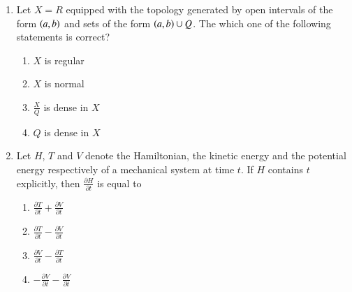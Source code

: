 \documentclass[journal]{IEEEtran}
\begin{document}
\begin{enumerate}
\item Let $X = R$ equipped with the topology generated by open intervals of the form $\left(
		a,b\right)$ and sets of the form $\left(a,b\right) \cup Q$. The which one of the following statements is correct?
\begin{multicols}{2}
    \begin{enumerate}
        \item $X$ is regular
        \item $X$ is normal
        \item $\frac{X}{Q}$ is dense in $X$
        \item $Q$ is dense in $X$
    \end{enumerate}
\end{multicols}

\item Let $H$, $T$ and $V$ denote the Hamiltonian, the kinetic energy and the potential energy respectively of a mechanical system at time $t$. If $H$ contains $t$ explicitly, then $\frac{\partial H}{\partial t}$ is equal to
\begin{multicols}{2}
    \begin{enumerate}
        \item $\frac{\partial T}{\partial t} + \frac{\partial V}{\partial t}$
        \item $\frac{\partial T}{\partial t} - \frac{\partial V}{\partial t}$
        \item $\frac{\partial V}{\partial t} - \frac{\partial T}{\partial t}$
        \item $-\frac{\partial V}{\partial t} - \frac{\partial V}{\partial t}$
    \end{enumerate}
\end{multicols}


\end{enumerate}
\end{document}
